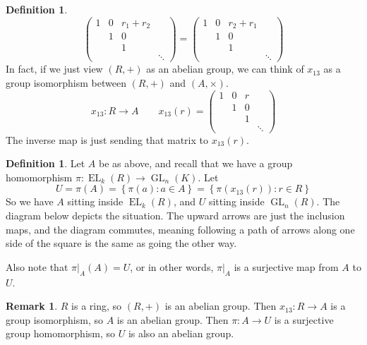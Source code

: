 \documentclass[12pt]{article}
\theoremstyle{definition}
\newtheorem{definition}[theorem]{Definition}
\newtheorem{remark}[theorem]{Remark}
\numberwithin{theorem}{subsection}
\newcommand{\lb}{\left\{}
\newcommand{\rb}{\right\}}
\DeclareMathOperator{\EL}{EL}
\DeclareMathOperator{\GL}{GL}
\begin{document}
\begin{definition}
\[
	\begin{pmatrix}
		1 & 0 & r_1 + r_2 \\
		& 1 & 0 \\
		& & 1 \\
		&&& \ddots
	\end{pmatrix}
	=
	\begin{pmatrix}
		1 & 0 & r_2 + r_1 \\
		& 1 & 0 \\
		& & 1 \\
		&&& \ddots
	\end{pmatrix}
\]
In fact, if we just view $(R,+)$ as an abelian group, we can think of $x_{13}$ as a group isomorphism between $(R,+)$ and $(A, \times)$.
\[
	x_{13}:R \to A \qquad x_{13}(r) = 
	\begin{pmatrix}
		1 & 0 & r \\
		& 1 & 0 \\
		& & 1 \\
		&&& \ddots
	\end{pmatrix}
\]
The inverse map is just sending that matrix to $x_{13}(r)$. 
\end{definition}

\begin{definition}
Let $A$ be as above, and recall that we have a group homomorphism $\pi:\EL_k(R) \to \GL_n(K)$. Let
\[
	U = \pi(A) = \lb \pi(a) : a \in A \rb = \lb \pi ( x_{13}(r) ) : r \in R \rb 
\]
So we have $A$ sitting inside $\EL_k(R)$, and $U$ sitting inside $\GL_n(R)$. The diagram below depicts the situation. The upward arrows are just the inclusion maps, and the diagram commutes, meaning following a path of arrows along one side of the square is the same as going the other way.
\begin{center}
\end{center}
Also note that $\pi|_A(A) = U$, or in other words, $\pi|_A$ is a surjective map from $A$ to $U$.
\end{definition}

\begin{remark}
$R$ is a ring, so $(R,+)$ is an abelian group. Then $x_{13}:R \to A$ is a group isomorphism, so $A$ is an abelian group. Then $\pi:A \to U$ is a surjective group homomorphism, so $U$ is also an abelian group.
\end{remark}
\end{document}
